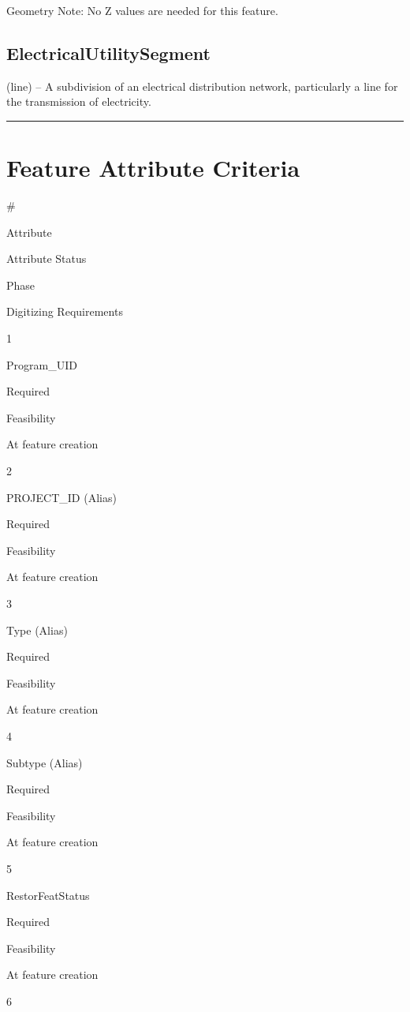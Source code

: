 \documentclass[
  letterpaper,
  DIV=11,
  numbers=noendperiod]{scrreprt}
\begin{document}
Geometry Note: No Z values are needed for this feature.

\subsection{ElectricalUtilitySegment}\label{electricalutilitysegment}

(line) -- A subdivision of an electrical distribution network,
particularly a line for the transmission of electricity.

\begin{center}\rule{0.5\linewidth}{0.5pt}\end{center}

\section{Feature Attribute
Criteria}\label{feature-attribute-criteria-20}

\#

Attribute

Attribute Status

Phase

Digitizing Requirements

1

Program\_UID

Required

Feasibility

At feature creation

2

PROJECT\_ID (Alias)

Required

Feasibility

At feature creation

3

Type (Alias)

Required

Feasibility

At feature creation

4

Subtype (Alias)

Required

Feasibility

At feature creation

5

RestorFeatStatus

Required

Feasibility

At feature creation

6
\end{document}
